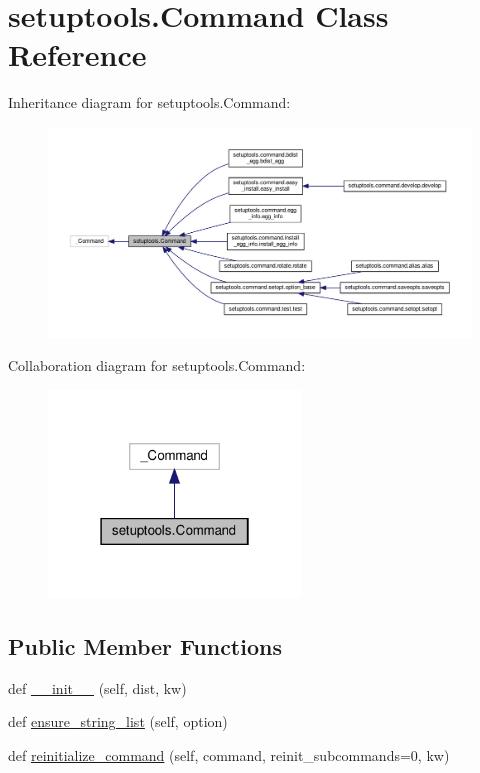 \hypertarget{classsetuptools_1_1Command}{}\section{setuptools.\+Command Class Reference}
\label{classsetuptools_1_1Command}


Inheritance diagram for setuptools.\+Command\+:
\nopagebreak
\begin{figure}[H]
\begin{center}
\leavevmode
\includegraphics[width=350pt]{classsetuptools_1_1Command__inherit__graph}
\end{center}
\end{figure}


Collaboration diagram for setuptools.\+Command\+:
\nopagebreak
\begin{figure}[H]
\begin{center}
\leavevmode
\includegraphics[width=190pt]{classsetuptools_1_1Command__coll__graph}
\end{center}
\end{figure}
\subsection*{Public Member Functions}
\begin{DoxyCompactItemize}
\item 
def \hyperlink{classsetuptools_1_1Command_a14ec5a9290a2b78f0ffe85b0144374b0}{\+\_\+\+\_\+init\+\_\+\+\_\+} (self, dist, kw)
\item 
def \hyperlink{classsetuptools_1_1Command_a34d329e0f917cf37d44c281ece76e54f}{ensure\+\_\+string\+\_\+list} (self, option)
\item 
def \hyperlink{classsetuptools_1_1Command_a0f2625d346bd4fd112eb84c199cb3951}{reinitialize\+\_\+command} (self, command, reinit\+\_\+subcommands=0, kw)
\end{DoxyCompactItemize}
